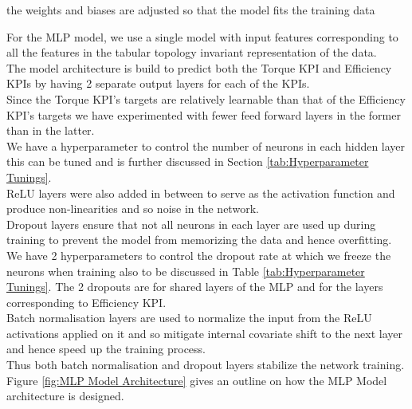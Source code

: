 \documentclass{report} %
\begin{document}
the weights and biases are adjusted so that the model fits the training data

For the \ac{MLP} model, we use a single model with input features corresponding to all the features in the tabular topology invariant representation of the data.\\
The model architecture is build to predict both the Torque \ac{KPI} and Efficiency \ac{KPI}s by having 2 separate output layers for each of the \ac{KPI}s. \\
Since the Torque \ac{KPI}'s targets are relatively learnable than that of the Efficiency \ac{KPI}'s targets we have experimented with fewer feed forward layers in the former than in the latter. \\
We have a hyperparameter to control the number of neurons in each hidden layer this can be tuned and is further discussed in Section \ref{tab:Hyperparameter Tunings}.\\
\ac{ReLU} layers were also added in between to serve as the activation function and produce non-linearities and so noise in the network. \\
Dropout layers ensure that not all neurons in each layer are used up during training to prevent the model from memorizing the data and hence overfitting.  
We have 2 hyperparameters to control the dropout rate at which we freeze the neurons when training also to be discussed in Table \ref{tab:Hyperparameter Tunings}.
The 2 dropouts are for shared layers of the \ac{MLP} and for the layers corresponding to Efficiency \ac{KPI}.\\
Batch normalisation layers are used to normalize the input from the \ac{ReLU} activations applied on it and so mitigate internal covariate shift to the next layer and hence speed up the training process.\\
Thus both batch normalisation and dropout layers stabilize the network training.\\

Figure \ref{fig:MLP Model Architecture} gives an outline on how the \ac{MLP} Model architecture is designed. \\
\end{document}
